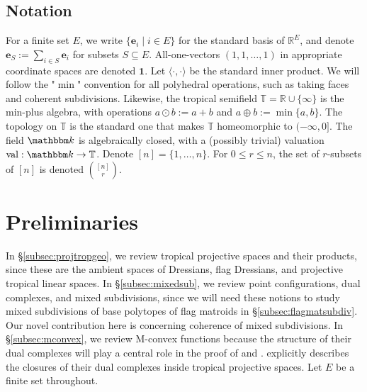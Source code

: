 \documentclass[11pt]{amsart}
\newcommand{\RR}{\mathbb R}
\newcommand{\TT}{\mathbb T}
\newcommand{\be}{\mathbf e}
\newcommand{\kk}{\mathbbm k}
\theoremstyle{definition}
\newcommand{\chris}[1]{{\color{cyan} \sf Chris: [#1]}}
\begin{document}
\subsection{Notation}
\label{notations}
For a finite set $E$, we write $\{\be_i \mid i\in E\}$ for the standard basis of $\RR^{E}$, and denote $\be_S := \sum_{i\in S} \be_i$ for subsets $S\subseteq E$.
All-one-vectors $(1,1,\ldots, 1)$ in appropriate coordinate spaces are denoted $\mathbf 1$.
Let $\langle \cdot, \cdot \rangle$ be the standard inner product.  We will follow the "$\min$" convention for all polyhedral operations, such as taking faces and coherent subdivisions.  Likewise, the tropical semifield $\TT = \RR \cup \{\infty\}$ is the min-plus algebra, with operations $a\odot b := a+b$ and $a\oplus b := \min\{a,b\}$.  The topology on $\TT$ is the standard one that makes $\TT$ homeomorphic to $(-\infty,0]$.  The field $\kk$ is algebraically closed, with a (possibly trivial) valuation $\operatorname{val}:\kk\to \TT$.  Denote $[n] = \{1,\ldots, n\}$.  For $0\leq r \leq n$, the set of $r$-subsets of $[n]$ is denoted $\binom{[n]}{r}$.

\section{Preliminaries %
}
\label{section:projtrop}

In \S\ref{subsec:projtropgeo}, we review tropical projective spaces and their products, since these are the ambient spaces of Dressians, flag Dressians, and projective tropical linear spaces.
In \S\ref{subsec:mixedsub}, we review point configurations, dual complexes, and mixed subdivisions, since we will need these notions to study mixed subdivisions of base polytopes of flag matroids in \S\ref{subsec:flagmatsubdiv}.
Our novel contribution here is  concerning coherence of mixed subdivisions.
In \S\ref{subsec:mconvex}, we review M-convex functions because the structure of their dual complexes will play a central role in the proof of  and .
  explicitly describes the closures of their dual complexes inside tropical projective spaces. 
Let $E$ be a finite set throughout.
\end{document}

